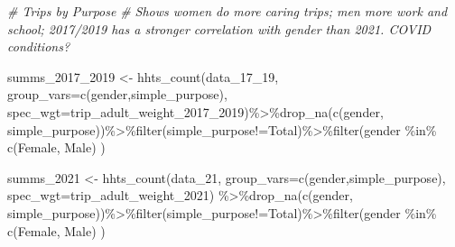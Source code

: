 \documentclass[
  12pt,
]{article}
\newenvironment{Shaded}{\begin{snugshade}}{\end{snugshade}}
\newcommand{\AttributeTok}[1]{\textcolor[rgb]{0.77,0.63,0.00}{#1}}
\newcommand{\CommentTok}[1]{\textcolor[rgb]{0.56,0.35,0.01}{\textit{#1}}}
\newcommand{\FunctionTok}[1]{\textcolor[rgb]{0.00,0.00,0.00}{#1}}
\newcommand{\NormalTok}[1]{#1}
\newcommand{\OtherTok}[1]{\textcolor[rgb]{0.56,0.35,0.01}{#1}}
\newcommand{\SpecialCharTok}[1]{\textcolor[rgb]{0.00,0.00,0.00}{#1}}
\newcommand{\StringTok}[1]{\textcolor[rgb]{0.31,0.60,0.02}{#1}}
\begin{document}
\begin{Shaded}
\begin{Highlighting}[]
\CommentTok{\# Trips by Purpose}
\CommentTok{\# Shows women do more caring trips; men more work and school; 2017/2019 has a stronger correlation with gender than 2021. COVID conditions?}

\NormalTok{  summs\_2017\_2019 }\OtherTok{\textless{}{-}} \FunctionTok{hhts\_count}\NormalTok{(data\_17\_19,}
                                        \AttributeTok{group\_vars=}\FunctionTok{c}\NormalTok{(}\StringTok{\textquotesingle{}gender\textquotesingle{}}\NormalTok{,}\StringTok{\textquotesingle{}simple\_purpose\textquotesingle{}}\NormalTok{),}
                                        \AttributeTok{spec\_wgt=}\StringTok{\textquotesingle{}trip\_adult\_weight\_2017\_2019\textquotesingle{}}\NormalTok{)}\SpecialCharTok{\%\textgreater{}\%}\FunctionTok{drop\_na}\NormalTok{(}\FunctionTok{c}\NormalTok{(}\StringTok{\textquotesingle{}gender\textquotesingle{}}\NormalTok{, }\StringTok{\textquotesingle{}simple\_purpose\textquotesingle{}}\NormalTok{))}\SpecialCharTok{\%\textgreater{}\%}\FunctionTok{filter}\NormalTok{(simple\_purpose}\SpecialCharTok{!=}\StringTok{\textquotesingle{}Total\textquotesingle{}}\NormalTok{)}\SpecialCharTok{\%\textgreater{}\%}\FunctionTok{filter}\NormalTok{(gender }\SpecialCharTok{\%in\%} \FunctionTok{c}\NormalTok{(}\StringTok{\textquotesingle{}Female\textquotesingle{}}\NormalTok{, }\StringTok{\textquotesingle{}Male\textquotesingle{}}\NormalTok{) )}

\NormalTok{  summs\_2021 }\OtherTok{\textless{}{-}} \FunctionTok{hhts\_count}\NormalTok{(data\_21,}
                                   \AttributeTok{group\_vars=}\FunctionTok{c}\NormalTok{(}\StringTok{\textquotesingle{}gender\textquotesingle{}}\NormalTok{,}\StringTok{\textquotesingle{}simple\_purpose\textquotesingle{}}\NormalTok{),}
                                   \AttributeTok{spec\_wgt=}\StringTok{\textquotesingle{}trip\_adult\_weight\_2021\textquotesingle{}}\NormalTok{) }\SpecialCharTok{\%\textgreater{}\%}\FunctionTok{drop\_na}\NormalTok{(}\FunctionTok{c}\NormalTok{(}\StringTok{\textquotesingle{}gender\textquotesingle{}}\NormalTok{, }\StringTok{\textquotesingle{}simple\_purpose\textquotesingle{}}\NormalTok{))}\SpecialCharTok{\%\textgreater{}\%}\FunctionTok{filter}\NormalTok{(simple\_purpose}\SpecialCharTok{!=}\StringTok{\textquotesingle{}Total\textquotesingle{}}\NormalTok{)}\SpecialCharTok{\%\textgreater{}\%}\FunctionTok{filter}\NormalTok{(gender }\SpecialCharTok{\%in\%} \FunctionTok{c}\NormalTok{(}\StringTok{\textquotesingle{}Female\textquotesingle{}}\NormalTok{, }\StringTok{\textquotesingle{}Male\textquotesingle{}}\NormalTok{) )}
  

\end{Highlighting}
\end{Shaded}
\end{document}
